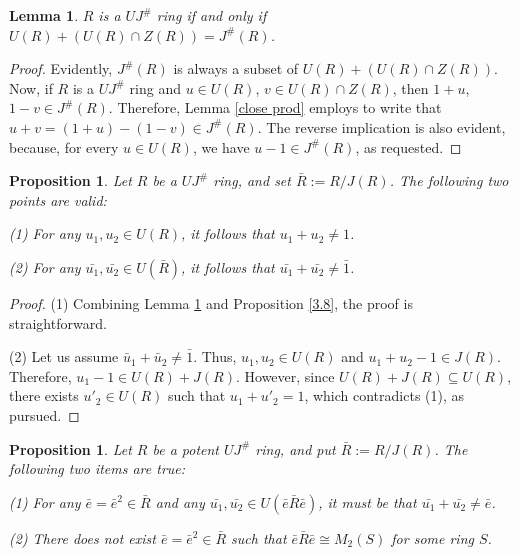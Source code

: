 \documentclass[12pt]{amsart}
\newtheorem{proposition}[theorem]{Proposition}
\newtheorem{lemma}[theorem]{Lemma}
\theoremstyle{definition}
\begin{document}
\begin{lemma}\label{equ UQ}
$R$ is a $UJ^{\#}$ ring if and only if $U(R) + (U(R)\cap Z(R)) = J^{\#}(R)$.
\end{lemma}

\begin{proof}
Evidently, $J^{\#}(R)$ is always a subset of $U(R) + (U(R)\cap Z(R))$. Now, if $R$ is a $UJ^{\#}$ ring and $u \in U(R)$, $v \in U(R) \cap Z(R)$, then $1+u$, $1-v \in J^{\#}(R)$. Therefore, Lemma \ref{close prod} employs to write that $u+v=(1+u)-(1-v) \in J^{\#}(R)$. The reverse implication is also evident, because, for every $u \in U(R)$, we have $u-1 \in J^{\#}(R)$, as requested.
\end{proof}

\begin{proposition}\label{2.2}
Let \( R \) be a $UJ^{\#}$ ring, and set \( \bar{R} := R/J(R) \). The following two points are valid:

(1) For any \( u_1, u_2 \in U(R) \), it follows that \( u_1 + u_2 \neq 1 \).

(2) For any \( \bar{u_1}, \bar{u_2} \in U(\bar{R}) \), it follows that \( \bar{u_1} + \bar{u_2} \neq \bar{1} \).
\end{proposition}

\begin{proof}
(1) Combining Lemma \ref{equ UQ} and Proposition \ref{3.8}, the proof is straightforward.
	
(2) Let us assume $\bar{u}_1 + \bar{u}_2 \neq \bar{1}$. Thus, $u_1, u_2 \in U(R)$ and $u_1 + u_2 - 1 \in J(R)$. Therefore, $u_1 - 1 \in U(R) + J(R)$. However, since $U(R) + J(R) \subseteq U(R)$, there exists $u'_2 \in U(R)$ such that $u_1 + u'_2 = 1$, which contradicts (1), as pursued.
\end{proof}

\begin{proposition}\label{2.3}
Let \( R \) be a potent $UJ^{\#}$ ring, and put \( \bar{R} := R/J(R) \). The following two items are true:

(1) For any \( \bar{e} = \bar{e}^2 \in \bar{R} \) and any \( \bar{u_1}, \bar{u_2} \in U(\bar{e} \bar{R} \bar{e}) \), it must be that \( \bar{u_1} + \bar{u_2} \neq \bar{e} \).

(2) There does not exist \( \bar{e} = \bar{e}^2 \in \bar{R} \) such that \( \bar{e} \bar{R} \bar{e} \cong M_2(S) \) for some ring \( S \).
\end{proposition}
\end{document}
